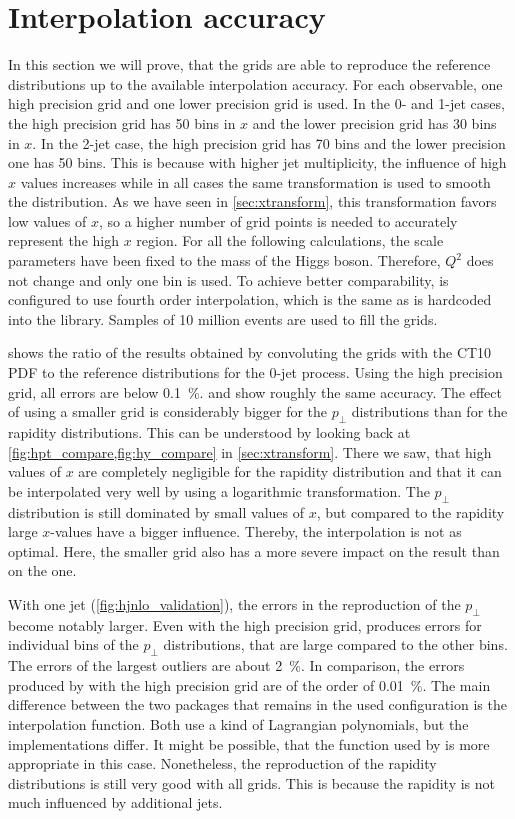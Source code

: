 \section{Interpolation accuracy}
In this section we will prove, that the grids are able to reproduce the reference distributions up to the available interpolation accuracy.
For each observable, one high precision grid and one lower precision grid is used.
In the 0- and 1-jet cases, the high precision grid has \num{50} bins in $x$ and the lower precision grid has \num{30} bins in $x$.
In the 2-jet case, the high precision grid has \num{70} bins and the lower precision one has \num{50} bins.
This is because with higher jet multiplicity, the influence of high $x$ values increases while in all cases the same transformation is used to smooth the distribution.
As we have seen in \cref{sec:xtransform}, this transformation favors low values of $x$, so a higher number of grid points is needed to accurately represent the high $x$ region.
For all the following calculations, the scale parameters have been fixed to the mass of the Higgs boson.
Therefore, $Q^2$ does not change and only one bin is used.
To achieve better comparability, \appl{} is configured to use fourth order interpolation, which is the same as is hardcoded into the \fnlo{} library.
Samples of \num{10} million events are used to fill the grids.

 shows the ratio of the results obtained by convoluting the grids with the CT10 PDF to the reference distributions for the 0-jet process.
Using the high precision grid, all errors are below \SI{0.1}{\percent}.
\appl{} and \fnlo{} show roughly the same accuracy.
The effect of using a smaller grid is considerably bigger for the $p_\perp$ distributions than for the rapidity distributions.
This can be understood by looking back at \cref{fig:hpt_compare,fig:hy_compare} in \cref{sec:xtransform}.
There we saw, that high values of $x$ are completely negligible for the rapidity distribution and that it can be interpolated very well by using a logarithmic transformation.
The $p_\perp$ distribution is still dominated by small values of $x$, but compared to the rapidity large $x$-values have a bigger influence.
Thereby, the interpolation is not as optimal.
Here, the smaller grid also has a more severe impact on the \appl{} result than on the \fnlo{} one.

With one jet (\cref{fig:hjnlo_validation}), the errors in the reproduction of the $p_\perp$ become notably larger.
Even with the high precision grid, \fnlo{} produces errors for individual bins of the $p_\perp$ distributions, that are large compared to the other bins.
The errors of the largest outliers are about \SI{2}{\percent}.
In comparison, the errors produced by \appl{} with the high precision grid are of the order of \SI{0.01}{\percent}.
The main difference between the two packages that remains in the used configuration is the interpolation function.
Both use a kind of Lagrangian polynomials, but the implementations differ.
It might be possible, that the function used by \appl{} is more appropriate in this case.
Nonetheless, the reproduction of the rapidity distributions is still very good with all grids.
This is because the rapidity is not much influenced by additional jets.

